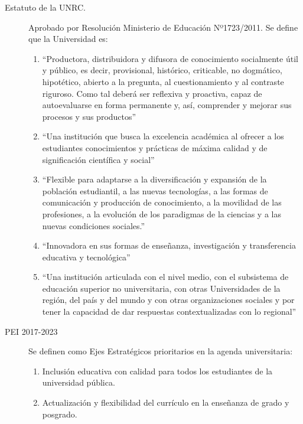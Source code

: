 \documentclass[a4paper, 12pt]{article}
\begin{document}
\begin{description}
 \item[Estatuto de la UNRC.]   Aprobado por Resolución Ministerio de Educación Nº1723/2011.  Se define que la Universidad es:
\begin{enumerate}

\item ``Productora, distribuidora y difusora de conocimiento socialmente útil y público, es
decir, provisional, histórico, criticable, no dogmático, hipotético, abierto a la
pregunta, al cuestionamiento y al contraste riguroso. Como tal deberá ser reflexiva
y proactiva, capaz de autoevaluarse en forma permanente y, así, comprender y
mejorar sus procesos y sus productos''


\item ``Una institución que busca la excelencia académica al ofrecer a los estudiantes
conocimientos y prácticas de máxima calidad y de significación científica y social''

\item ``Flexible para adaptarse a la diversificación y expansión de la población estudiantil, 
a las nuevas tecnologías, a las formas de comunicación y producción de
conocimiento, a la movilidad de las profesiones, a la evolución de los paradigmas
de la ciencias y a las nuevas condiciones sociales.''

\item ``Innovadora en sus formas de enseñanza, investigación y transferencia educativa y
tecnológica''

\item ``Una institución articulada con el nivel medio, con el subsistema de educación
superior no universitaria, con otras Universidades de la región, del país y del
mundo y con otras organizaciones sociales y por tener la capacidad de dar
respuestas contextualizadas con lo regional''

\end{enumerate}

\item[PEI 2017-2023] Se definen como Ejes Estratégicos prioritarios en la agenda universitaria:
\begin{enumerate}
 \item Inclusión    educativa    con    calidad    para         todos  los  estudiantes  de  la  universidad  pública.
 
 \item  Actualización  y  flexibilidad  del  currículo  en la enseñanza de grado y posgrado.
 

\end{enumerate}
\end{description}
\end{document}

